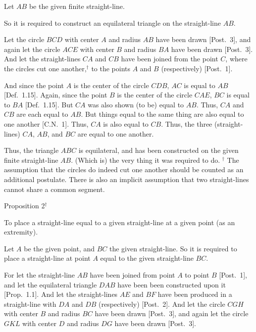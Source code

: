 Let $AB$ be the given finite straight-line.

So it is required to construct an equilateral triangle on the straight-line $AB$.

Let the circle $BCD$ with center $A$ and radius $AB$ have been drawn [Post.~3], and again
let the circle $ACE$ with center $B$ and radius $BA$ have been drawn [Post.~3].
And let the straight-lines $CA$ and $CB$ have been joined from the point $C$, where the circles cut one another,$^\dag$ to the points $A$ and $B$ (respectively) [Post.~1].

And since the point $A$ is the center of the circle $CDB$, $AC$ is equal to $AB$ [Def.~1.15]. Again,
since the point $B$ is the center of the circle $CAE$, $BC$ is equal to $BA$ [Def.~1.15]. But $CA$ 
was also shown (to be) equal to $AB$. Thus, $CA$ and $CB$ are each equal to $AB$. But things equal to the same thing are also equal to one another [C.N.~1]. Thus, $CA$ is also equal to $CB$. Thus, the three (straight-lines) $CA$, $AB$, and $BC$ are equal to one another.

Thus, the triangle $ABC$ is equilateral, and has been constructed on the
given finite straight-line $AB$. (Which is) the very thing it was required to do.
{\footnotesize
\noindent $^\dag$ The assumption that the circles do indeed cut one another should be counted as an additional 
postulate. There is also an implicit assumption that two straight-lines cannot share a common segment.}


\begin{center}
{\large Proposition 2$^\dag$}
\end{center}

To place a straight-line equal to a given straight-line at a given point (as an extremity).

Let $A$ be the given point, and $BC$ the given straight-line. So  it is required to
place a straight-line at point $A$ equal to the given straight-line $BC$.

For  let the straight-line $AB$ have been joined from point $A$ to point $B$ [Post.~1], and let the
equilateral triangle $DAB$ have been been constructed upon it [Prop.~1.1].  And let the
straight-lines $AE$ and $BF$ have been produced in a straight-line with $DA$ and $DB$  (respectively) [Post.~2].
And let the circle $CGH$ with center $B$ and radius $BC$ have been drawn
[Post.~3], and again let the circle $GKL$ with center $D$ and radius $DG$ have been drawn [Post.~3].

